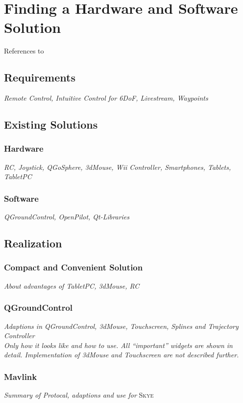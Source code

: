 \graphicspath{{graphics/HMI/}{graphics/control_modes/}}
\chapter{Finding a Hardware and Software Solution}
\label{cha:findHardSoftSolution}
References to \cite{kammermann}
\section{Requirements}
\label{sec:requirements}
\textit{Remote Control, Intuitive Control for 6DoF, Livestream, Waypoints}
\section{Existing Solutions}
\label{sec:existingSolutions}
\subsection{Hardware}
\label{sub:hardware}
\textit{RC, Joystick, QGoSphere, 3dMouse, Wii Controller, Smartphones, Tablets, TabletPC}
\subsection{Software}
\textit{QGroundControl, OpenPilot, Qt-Libraries}
\section{Realization}
\label{sec:realization}
\subsection{Compact and Convenient Solution}
\textit{About advantages of TabletPC, 3dMouse, RC}
\subsection{QGroundControl}
\textit{Adaptions in QGroundControl, 3dMouse, Touchscreen, Splines and Trajectory Controller \\ Only how it looks like and how to use. All ``important'' widgets are shown in detail. Implementation of 3dMouse and Touchscreen are not described further.}
\subsection{Mavlink}
\textit{Summary of Protocal, adaptions and use for} \textsc{Skye}




